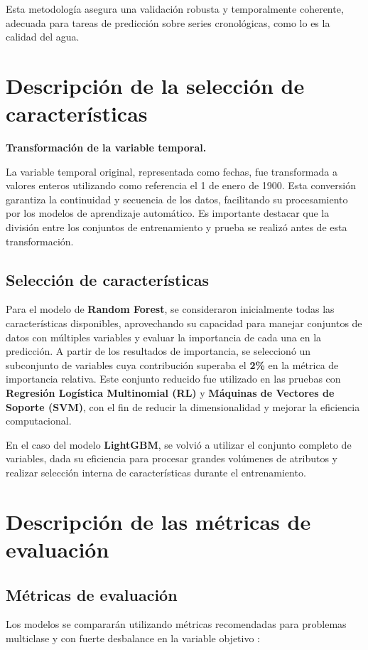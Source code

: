\documentclass[11pt]{report}
\begin{document}
Esta metodología asegura una validación robusta y temporalmente coherente, adecuada para tareas de predicción sobre series cronológicas, como lo es la calidad del agua.\cite{brownlee2018walkforward}

\section{Descripción de la selección de características}

\textbf{Transformación de la variable temporal.}

La variable temporal original, representada como fechas, fue transformada a valores enteros utilizando como referencia el 1 de enero de 1900. Esta conversión garantiza la continuidad y secuencia de los datos, facilitando su procesamiento por los modelos de aprendizaje automático. Es importante destacar que la división entre los conjuntos de entrenamiento y prueba se realizó antes de esta transformación.


\subsection{Selección de características}

Para el modelo de \textbf{Random Forest}, se consideraron inicialmente todas las características disponibles, aprovechando su capacidad para manejar conjuntos de datos con múltiples variables y evaluar la importancia de cada una en la predicción. A partir de los resultados de importancia, se seleccionó un subconjunto de variables cuya contribución superaba el \textbf{2\%} en la métrica de importancia relativa. Este conjunto reducido fue utilizado en las pruebas con \textbf{Regresión Logística Multinomial (RL)} y \textbf{Máquinas de Vectores de Soporte (SVM)}, con el fin de reducir la dimensionalidad y mejorar la eficiencia computacional.

En el caso del modelo \textbf{LightGBM}, se volvió a utilizar el conjunto completo de variables, dada su eficiencia para procesar grandes volúmenes de atributos y realizar selección interna de características durante el entrenamiento.


\section{Descripción de las métricas de evaluación}


\subsection{Métricas de evaluación}
Los modelos se compararán utilizando métricas recomendadas para problemas
multiclase y con fuerte desbalance en la variable objetivo \citep{Powers2011}:
\end{document}
